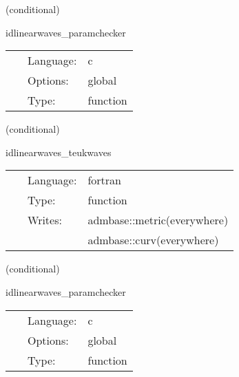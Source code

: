 \documentclass{article}
\begin{document}
\vspace{5mm}

   (conditional) 

\hspace{5mm} idlinearwaves\_paramchecker 

\hspace{5mm}{\it check that the metric\_type is recognised } 


\hspace{5mm}

 \begin{tabular*}{160mm}{cll} 
~ & Language:  & c \\ 
~ & Options:  & global \\ 
~ & Type:  & function \\ 
\end{tabular*} 


\vspace{5mm}

   (conditional) 

\hspace{5mm} idlinearwaves\_teukwaves 

\hspace{5mm}{\it construct linear teukolsky wave initial data } 


\hspace{5mm}

 \begin{tabular*}{160mm}{cll} 
~ & Language:  & fortran \\ 
~ & Type:  & function \\ 
~ & Writes:  & admbase::metric(everywhere) \\ 
~& ~ &admbase::curv(everywhere)\\ 
\end{tabular*} 


\vspace{5mm}

   (conditional) 

\hspace{5mm} idlinearwaves\_paramchecker 

\hspace{5mm}{\it check that the metric\_type is recognised } 


\hspace{5mm}

 \begin{tabular*}{160mm}{cll} 
~ & Language:  & c \\ 
~ & Options:  & global \\ 
~ & Type:  & function \\ 
\end{tabular*} 
\end{document}
